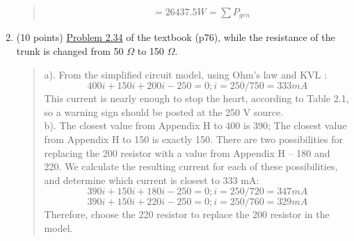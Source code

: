 \documentclass[12pt,a4paper]{article}
\begin{document}
\begin{enumerate}
\begin{quote}
\begin{align*}
        &=26437.5W=\sum P_{gen}
        \end{align*}
    \end{quote}
    \item (10 points) \uline{Problem 2.34} of the textbook (p76), while the resistance of the trunk is changed from 50 $\Omega$ to 150 $\Omega$.
    \begin{quote}
        a). From the simplified circuit model, using Ohm’s law and KVL :
        \[400i + 150i+200i-250=0; i=250/750=333 mA \]
        This current is nearly enough to stop the heart, according to Table 2.1, so a warning sign
        should be posted at the 250 V source.\\
        b). The closest value from Appendix H to 400 is 390; The closest value from Appendix H to 150 is exactly 150. There are two possibilities for replacing the 200 resistor with a value from Appendix H – 180 and 220. We calculate the resulting current for each of these possibilities, and determine which current is closest to 333 mA:
        \[390i+150i+180i-250=0;i=250/720=347mA\]
        \[390i+150i+220i-250=0;i=250/760=329mA\]
        Therefore, choose the 220 resistor to replace the 200 resistor in the model.
    \end{quote}
\end{enumerate}
\end{document}
